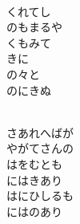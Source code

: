 \documentclass[10pt,b5j]{tarticle} %
\begin{document}
\vspace{1.5em} %
\newcommand{\linespace}{0.5em} %
\newcommand{\blocksize}{0.5\hsize} %
\newcommand{\itemmargin}{3em} %
\begin{enumerate} %
    \setlength{\itemindent}{\itemmargin} %
    \begin{minipage}[c]{\blocksize}
    
        \vspace{\linespace}
        \item~\\
        くれてし\\
        のもまるや\\
        くもみて\\
        きに\\
        の々と\\
        のにきぬ
        
    \end{minipage}
    \begin{minipage}[c]{\blocksize}
        
        \vspace{\linespace}
        \item~\\
        さあれへばが\\
        やがてさんの\\
        はをむとも\\
        にはきあり\\
        はにひしるも\\
        にはのあり
        
    \end{minipage}
    \begin{minipage}[c]{\blocksize}
        

\end{minipage}
\end{enumerate}
\end{document}
